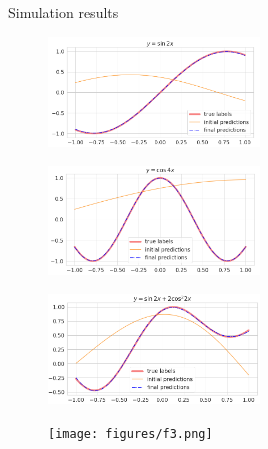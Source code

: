 \documentclass[9pt, xcolor={svgnames}, hyperref={colorlinks, linkcolor=black, citecolor=amethyst, urlcolor=amethyst}]{beamer}
\begin{document}
\begin{frame}{Simulation results}

\begin{multicols}{2}
\begin{figure}
    \centering 
    \includegraphics[width=0.5\textwidth]{figures/f0.png}
\end{figure}
\begin{figure}
    \centering 
    \includegraphics[width=0.5\textwidth]{figures/f1.png}
\end{figure}
\end{multicols}  
\begin{multicols}{2}
\begin{figure}
    \centering 
    \includegraphics[width=0.5\textwidth]{figures/f2.png}
\end{figure}
\begin{figure}
    \centering 
    \texttt{[image: figures/f3.png]}
\end{figure}
\end{multicols}

\end{frame}
\end{document}
